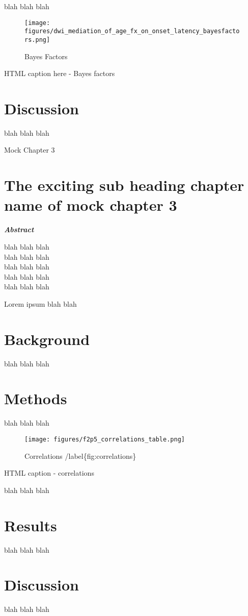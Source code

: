 \documentclass{report}
\begin{document}
    blah blah blah

    \begin{figure}[htbp]
\centering
\texttt{[image: figures/dwi\_mediation\_of\_age\_fx\_on\_onset\_latency\_bayesfactors.png]}
\caption{Bayes Factors \label{fig:Bayes factors}}
\end{figure}

HTML caption here - Bayes factors


    \chapter{Discussion}


    blah blah blah


    {Mock Chapter 3}



    \chapter{The exciting sub heading chapter name of mock chapter 3}


    \textbf{\emph{Abstract}}

    blah blah blah\\blah blah blah\\blah blah blah\\blah blah blah\\blah
blah blah

    Lorem ipsum blah blah


    \chapter{Background}


    blah blah blah


    \chapter{Methods}


    blah blah blah

    \begin{figure}[htbp]
\centering
\texttt{[image: figures/f2p5\_correlations\_table.png]}
\caption{Correlations /label\{fig:correlations\}}
\end{figure}

HTML caption - correlations

    blah blah blah


    \chapter{Results}


    blah blah blah


    \chapter{Discussion}


    blah blah blah



    
    



    
    
\end{document}
